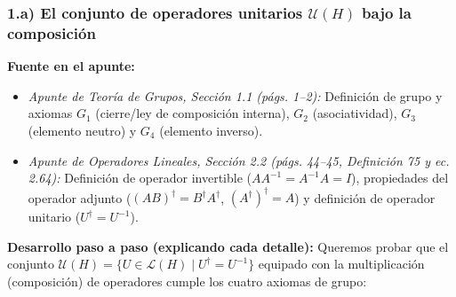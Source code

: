 \documentclass[11pt, a4paper]{article}
\begin{document}
\subsubsection*{1.a) El conjunto de operadores unitarios $\mathcal{U}(H)$ bajo la composición}
\textbf{Fuente en el apunte:}
\begin{itemize}
    \item \textit{Apunte de Teoría de Grupos, Sección 1.1 (págs. 1--2):} Definición de grupo y axiomas $G_1$ (cierre/ley de composición interna), $G_2$ (asociatividad), $G_3$ (elemento neutro) y $G_4$ (elemento inverso).
    \item \textit{Apunte de Operadores Lineales, Sección 2.2 (págs. 44--45, Definición 75 y ec. 2.64):} Definición de operador invertible ($A A^{-1} = A^{-1} A = I$), propiedades del operador adjunto ($(AB)^\dagger = B^\dagger A^\dagger$, $(A^\dagger)^\dagger = A$) y definición de operador unitario ($U^\dagger = U^{-1}$).
\end{itemize}

\textbf{Desarrollo paso a paso (explicando cada detalle):}
Queremos probar que el conjunto $\mathcal{U}(H) = \{U \in \mathcal{L}(H) \mid U^\dagger = U^{-1}\}$ equipado con la multiplicación (composición) de operadores cumple los cuatro axiomas de grupo:
\end{document}
